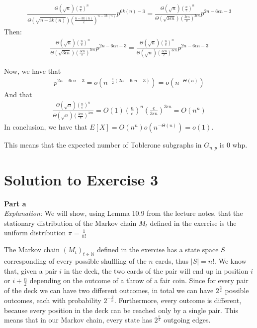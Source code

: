 \documentclass[a4paper,german]{article}
\begin{document}
\begin{align*}
	\frac{\Theta(\sqrt{n}){(\frac{n}{e})^n}}
	{\Theta(\sqrt{n - 3k(n)}) (\frac{n - 3k(n)}{e})^{n - 3k(n)}} p^{6k(n) - 3}
	= \frac{\Theta(\sqrt{n}){(\frac{n}{e})^n}}{\Theta(\sqrt{3\epsilon n})(\frac{3\epsilon n}{e})^{3\epsilon n}} p^{2n - 6\epsilon n - 3}
\end{align*}
Then:
\begin{align*}
	\frac{\Theta(\sqrt{n}){(\frac{n}{e})^n}}{\Theta(\sqrt{3\epsilon n})(\frac{3\epsilon n}{e})^{3\epsilon n}} p^{2n - 6\epsilon n - 3}
	= \frac{\Theta(\sqrt{n}){(\frac{n}{e})^n}}{\Theta(\sqrt{n})(\frac{3\epsilon n}{e})^{3\epsilon n}} p^{2n - 6\epsilon n - 3}
\end{align*}

Now, we have that 
\begin{align*}
	p^{2n - 6\epsilon n - 3} = o( n^{-\frac{1}{2}(2n - 6 \epsilon n - 3)}) 
	= o (n ^{-\Theta(n)})
\end{align*}
And that
\begin{align*}
\frac{\Theta(\sqrt{n}){(\frac{n}{e})^n}}{\Theta(\sqrt{n})(\frac{3\epsilon n}{e})^{3\epsilon n}}  
	= O(1) \left(\frac{n}{e}\right)^n  \left(\frac{e}{3\epsilon n}\right)^{3\epsilon n}
	= O(n^n)
\end{align*}
In conclusion, we have that
$E[X] = O(n^n) o(n^{-\Theta(n)}) = o(1)$.

This means that the expected number of Toblerone subgraphs in $G_{n,p}$ is 0 whp.




\section*{Solution to Exercise 3}
\textbf{Part a} \\
\emph{Explanation:} We will show, using Lemma 10.9 from the lecture notes, that the stationary distribution of the  Markov chain $M_t$ defined in the exercise is the uniform distribution $\pi = \frac{1}{n!}$
\vspace{1em}

The Markov chain $(M_t)_{t\in\mathbb{N}}$ defined in the exercise has a state space $S$ corresponding of every possible shuffling of the $n$ cards, thus $|S| = n!$.
We know that, given a pair $i$ in the deck, the two cards of the pair will end up in position $i$ or $i + \frac{n}{2}$ depending on the outcome of a throw of a fair coin. Since for every pair of the deck we can have two different outcomes, in total we can have $2^{\frac{n}{2}}$ possible outcomes, each with probability $2^{-\frac{2}{n}}$. Furthermore, every outcome is different, because every position in the deck can be reached only by a single pair. 
This means that in our Markov chain, every state has $2^{\frac{n}{2}}$ outgoing edges.
\end{document}
